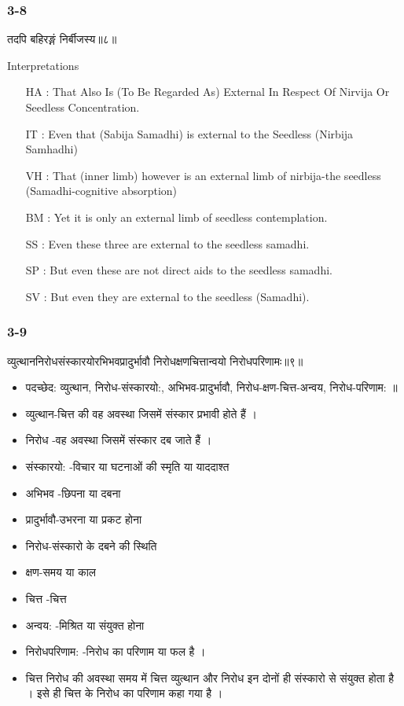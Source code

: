 \begin{frame}[fragile]\frametitle{3-8}
\begin{sanskrit}
तदपि बहिरङ्गं निर्बीजस्य॥८॥
\end{sanskrit}

Interpretations
\begin{itemize}	
\item [HA]: That Also Is (To Be Regarded As) External In Respect Of Nirvija Or Seedless Concentration.
\item [IT]: Even that (Sabija Samadhi) is external to the Seedless (Nirbija Samhadhi)
\item [VH]: That (inner limb) however is an external limb of nirbija-the seedless (Samadhi-cognitive absorption)
\item [BM]: Yet it is only an external limb of seedless contemplation.
\item [SS]: Even these three are external to the seedless samadhi.
\item [SP]: But even these are not direct aids to the seedless samadhi.
\item [SV]: But even they are external to the seedless (Samadhi). 
\end{itemize}
\end{frame}


\begin{frame}[fragile]\frametitle{3-9}
\begin{sanskrit}
व्युत्थाननिरोधसंस्कारयोरभिभवप्रादुर्भावौ निरोधक्षणचित्तान्वयो निरोधपरिणामः॥९॥
\end{sanskrit}

\begin{itemize}
\item पदच्छेद: व्युत्थान, निरोध-संस्कारयो:, अभिभव-प्रादुर्भावौ, निरोध-क्षण-चित्त-अन्वय, निरोध-परिणाम: ॥
\item व्युत्थान-चित्त की वह अवस्था जिसमें संस्कार प्रभावी होते हैं ।
\item निरोध -वह अवस्था जिसमें संस्कार दब जाते हैं ।
\item संस्कारयो: -विचार या घटनाओं की स्मृति या याददाश्त
\item अभिभव -छिपना या दबना
\item प्रादुर्भावौ-उभरना या प्रकट होना
\item निरोध-संस्कारो के दबने की स्थिति
\item क्षण-समय या काल
\item चित्त -चित्त
\item अन्वय: -मिश्रित या संयुक्त होना
\item निरोधपरिणाम: -निरोध का परिणाम या फल है ।	
\item चित्त निरोध की अवस्था समय में चित्त व्युत्थान और निरोध इन दोनों ही संस्कारो से संयुक्त होता है । इसे ही चित्त के निरोध का परिणाम कहा गया है ।
\end{itemize}
\end{frame}

